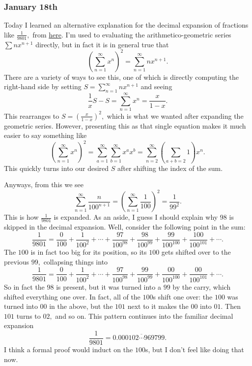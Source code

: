 \subsubsection{January 18th}
Today I learned an alternative explanation for the decimal expansion of fractions like $\frac1{9801},$ from \href{https://math.stackexchange.com/a/102684/869257}{here}. I'm used to evaluating the arithmetico-geometric series $\sum nx^{n+1}$ directly, but in fact it is in general true that
\[\left(\sum_{n=1}^\infty x^n\right)^2=\sum_{n=1}^\infty nx^{n+1}.\]
There are a variety of ways to see this, one of which is directly computing the right-hand side by setting $S=\sum_{n=1}^\infty nx^{n+1}$ and seeing
\[\frac1xS-S=\sum_{n=1}^\infty x^n=\frac x{1-x}.\]
This rearranges to $S=\left(\frac x{1-x}\right)^2,$ which is what we wanted after expanding the geometric series. However, presenting this as that single equation makes it much easier to say something like
\[\left(\sum_{n=1}^\infty x^n\right)^2=\sum_{a=1}^\infty\sum_{b=1}^\infty x^ax^b=\sum_{n=2}^\infty\left(\sum_{a+b=2}1\right)x^n.\]
This quickly turns into our desired $S$ after shifting the index of the sum.

Anyways, from this we see
\[\sum_{n=1}^\infty\frac n{100^{n+1}}=\left(\sum_{n=1}^\infty\frac1{100}\right)^2=\frac1{99^2}.\]
This is how $\frac1{9801}$ is expanded. As an aside, I guess I should explain why $98$ is skipped in the decimal expansion. Well, consider the following point in the sum:
\[\frac1{9801}=\frac0{100}+\frac1{100^2}+\cdots+\frac{97}{100^{98}}+\frac{98}{100^{99}}+\frac{99}{100^{100}}+\frac{100}{100^{101}}+\cdots.\]
The $100$ is in fact too big for its position, so its $100$ gets shifted over to the previous $99,$ collapsing things into
\[\frac1{9801}=\frac0{100}+\frac1{100^2}+\cdots+\frac{97}{100^{98}}+\frac{99}{100^{99}}+\frac{00}{100^{100}}+\frac{00}{100^{101}}+\cdots.\]
So in fact the $98$ is present, but it was turned into a $99$ by the carry, which shifted everything one over. In fact, all of the $100$s shift one over: the $100$ was turned into $00$ in the above, but the $101$ next to it makes the $00$ into $01.$ Then $101$ turns to $02,$ and so on. This pattern continues into the familiar decimal expansion
\[\frac1{9801}=0.\overline{000102\cdots969799}.\]
I think a formal proof would induct on the $100$s, but I don't feel like doing that now.

